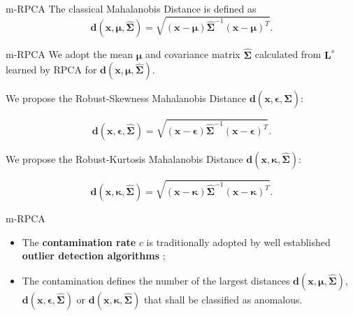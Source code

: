 \documentclass[newPxFont, numfooter, sectionpages]{beamer}
\begin{document}
\begin{frame}[c]{m-RPCA}
    The classical Mahalanobis Distance is defined as		
    \begin{equation}\label{eq:4.12}
    	\pmb{d}(\pmb{x}, \pmb{\mu}, \hat{\pmb{\Sigma}}) = \sqrt{(\pmb{x} - \pmb{\mu}) \hat{\pmb{\Sigma}}^{-1}(\pmb{x} - \pmb{\mu})^T}.
    \end{equation}
\end{frame}

\begin{frame}[c]{m-RPCA}
    We adopt the mean $\pmb{\mu}$ and covariance matrix $\hat{\pmb{\Sigma}}$ calculated from $\pmb{L}^s$ learned by RPCA for $\pmb{d}(\pmb{x}, \pmb{\mu}, \hat{\pmb{\Sigma}})$.
    
    We propose the Robust-Skewness Mahalanobis Distance $\pmb{d}(\pmb{x}, \pmb{\epsilon}, \hat{\pmb{\Sigma}})$:

    \begin{equation}\label{eq:4.13}
    	\pmb{d}(\pmb{x}, \pmb{\epsilon}, \hat{\pmb{\Sigma}}) = \sqrt{(\pmb{x} - \pmb{\epsilon}) \hat{\pmb{\Sigma}}^{-1}(\pmb{x} - \pmb{\epsilon})^T}.
    \end{equation}

    We propose the Robust-Kurtosis Mahalanobis Distance $\pmb{d}(\pmb{x}, \pmb{\kappa}, \hat{\pmb{\Sigma}})$:
    
    \begin{equation}\label{eq:4.14}
    	\pmb{d}(\pmb{x}, \pmb{\kappa}, \hat{\pmb{\Sigma}}) = \sqrt{(\pmb{x} - \pmb{\kappa}) \hat{\pmb{\Sigma}}^{-1}(\pmb{x} - \pmb{\kappa})^T}.
    \end{equation}
\end{frame}

\begin{frame}[c]{m-RPCA}
	\begin{itemize}
		\item The\textbf{ contamination rate} $c$ is traditionally adopted by well established \textbf{outlier detection algorithms} \cite{zhao2019pyod};
		\item The contamination defines the number of the largest distances $\pmb{d}(\pmb{x}, \pmb{\mu}, \hat{\pmb{\Sigma}})$, $\pmb{d}(\pmb{x}, \pmb{\epsilon}, \hat{\pmb{\Sigma}})$ or $\pmb{d}(\pmb{x}, \pmb{\kappa}, \hat{\pmb{\Sigma}})$ that shall be classified as anomalous.
	\end{itemize}
\end{frame}
\end{document}
